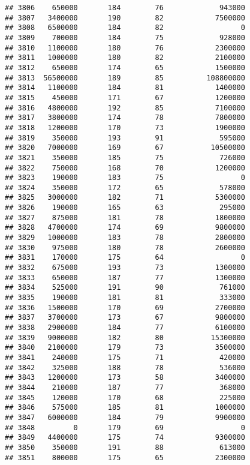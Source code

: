 \documentclass[
]{article}
\begin{document}
\begin{verbatim}
## 3806    650000       184        76             943000
## 3807   3400000       190        82            7500000
## 3808   6500000       184        82                  0
## 3809    700000       184        75             928000
## 3810   1100000       180        76            2300000
## 3811   1000000       180        82            2100000
## 3812    650000       174        65            1500000
## 3813  56500000       189        85          108800000
## 3814   1100000       184        81            1400000
## 3815    450000       171        67            1200000
## 3816   4800000       192        85            7100000
## 3817   3800000       174        78            7800000
## 3818   1200000       170        73            1900000
## 3819    350000       193        91             595000
## 3820   7000000       169        67           10500000
## 3821    350000       185        75             726000
## 3822    750000       168        70            1200000
## 3823    190000       183        75                  0
## 3824    350000       172        65             578000
## 3825   3000000       182        71            5300000
## 3826    190000       165        63             295000
## 3827    875000       181        78            1800000
## 3828   4700000       174        69            9800000
## 3829   1000000       183        78            2800000
## 3830    975000       180        78            2600000
## 3831    170000       175        64                  0
## 3832    675000       193        73            1300000
## 3833    650000       187        77            1300000
## 3834    525000       191        90             761000
## 3835    190000       181        81             333000
## 3836   1500000       170        69            2700000
## 3837   3700000       173        67            9800000
## 3838   2900000       184        77            6100000
## 3839   9000000       182        80           15300000
## 3840   2100000       179        73            3500000
## 3841    240000       175        71             420000
## 3842    325000       188        78             536000
## 3843   1200000       173        58            3400000
## 3844    210000       187        77             368000
## 3845    120000       170        68             225000
## 3846    575000       185        81            1000000
## 3847   6000000       184        79            9900000
## 3848         0       179        69                  0
## 3849   4400000       175        74            9300000
## 3850    350000       191        88             613000
## 3851    800000       175        65            2300000

\end{verbatim}
\end{document}
